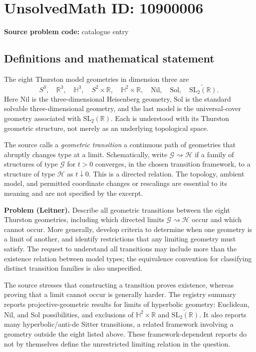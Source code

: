 \documentclass[11pt]{article}
\newcommand{\R}{\mathbb{R}}
\begin{document}
\section*{UnsolvedMath ID: 10900006}
\textbf{Source problem code:} catalogue entry
\subsection{Definitions and mathematical statement}
The eight Thurston model geometries in dimension three are
\[
 S^3,\quad \R^3,\quad \mathbb H^3,\quad S^2\times\R,\quad
 \mathbb H^2\times\R,\quad \mathrm{Nil},\quad \mathrm{Sol},\quad
 \widetilde{\mathrm{SL}_2(\R)}.
\]
Here $\mathrm{Nil}$ is the three-dimensional Heisenberg geometry, $\mathrm{Sol}$ is the standard solvable three-dimensional geometry, and the last model is the universal-cover geometry associated with $\mathrm{SL}_2(\R)$. Each is understood with its Thurston geometric structure, not merely as an underlying topological space.

The source calls a \emph{geometric transition} a continuous path of geometries that abruptly changes type at a limit. Schematically, write $\mathcal G\rightsquigarrow\mathcal H$ if a family of structures of type $\mathcal G$ for $t>0$ converges, in the chosen transition framework, to a structure of type $\mathcal H$ as $t\downarrow0$. This is a directed relation. The topology, ambient model, and permitted coordinate changes or rescalings are essential to its meaning and are not specified by the excerpt.

\textbf{Problem (Leitner).} Describe all geometric transitions between the eight Thurston geometries, including which directed limits $\mathcal G\rightsquigarrow\mathcal H$ occur and which cannot occur. More generally, develop criteria to determine when one geometry is a limit of another, and identify restrictions that any limiting geometry must satisfy. The request to understand all transitions may include more than the existence relation between model types; the equivalence convention for classifying distinct transition families is also unspecified.

The source stresses that constructing a transition proves existence, whereas proving that a limit cannot occur is generally harder. The registry summary reports projective-geometric results for limits of hyperbolic geometry: Euclidean, Nil, and Sol possibilities, and exclusions of $\mathbb H^2\times\R$ and $\widetilde{\mathrm{SL}_2(\R)}$. It also reports many hyperbolic/anti-de Sitter transitions, a related framework involving a geometry outside the eight listed above. These framework-dependent reports do not by themselves define the unrestricted limiting relation in the question.
\end{document}

